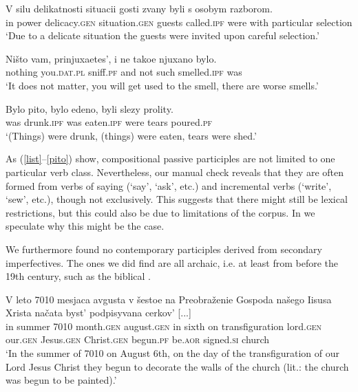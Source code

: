 \documentclass[output=paper,modfonts,newtxmath,hidelinks
\ChapterDOI{10.5281/zenodo.2545513}
]{langscibook}
\begin{document}
\ea\gll	V silu delikatnosti situacii gosti zvany byli s osobym razborom. \label{zvany}\\
	in power delicacy.\textsc{gen} situation.\textsc{gen} guests called.\textsc{ipf} were with particular selection\\
\glt	`Due to a delicate situation the guests were invited upon careful selection.'
\z

\ea\gll	Ništo vam, prinjuxaetes', i ne takoe njuxano bylo. \label{njuxano}\\ 
	nothing you.\textsc{dat}.\textsc{pl} sniff.\textsc{pf} and not such smelled.\textsc{ipf} was\\
\glt	`It does not matter, you will get used to the smell, there are worse smells.'
\z

\ea\gll	Bylo pito, bylo edeno, byli slezy prolity. \label{pito}\\
	was drunk.\textsc{ipf} was eaten.\textsc{ipf} were tears poured.\textsc{pf}\\
\glt	`(Things) were drunk, (things) were eaten, tears were shed.'
\z

\noindent As (\ref{list}--\ref{pito}) show, compositional   passive participles are not limited to one particular verb class. Nevertheless, our manual check reveals that they are often formed from verbs of saying (`say', `ask', etc.) and incremental verbs (`write', `sew', etc.), though not exclusively. This suggests that there might still be lexical restrictions, but this could also be due to limitations of the corpus. In  we speculate why this might be the case. 

We furthermore found no contemporary participles derived from secondary imperfectives. The ones we did find are all archaic, i.e. at least from before the 19th century, such as the biblical . 

\ea\gll	V leto 7010 mesjaca avgusta v šestoe na Preobraženie Gospoda našego Iisusa Xrista načata byst' podpisyvana cerkov' [...] \label{7010} \\
	in summer 7010 month.\textsc{gen} august.\textsc{gen} in sixth on transfiguration lord.\textsc{gen} our.\textsc{gen} Jesus.\textsc{gen} Christ.\textsc{gen} begun.\textsc{pf} be.\textsc{aor} signed.\textsc{si} church \\ 
\glt    `In the summer of 7010 on August 6th, on the day of the transfiguration of our Lord Jesus Christ they begun to decorate the walls of the church (lit.: the church was begun to be painted).'
\z
\end{document}
